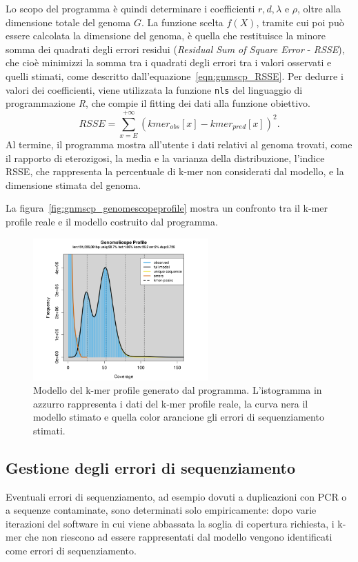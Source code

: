 \documentclass[crop=false, class=book]{standalone}
\begin{document}
	Lo scopo del programma è quindi determinare i coefficienti $r, d, \lambda$ e $\rho$, oltre alla dimensione totale del genoma $G$. La funzione scelta $f(X)$, tramite cui poi può essere calcolata la dimensione del genoma, è quella che restituisce la minore somma dei quadrati degli errori residui (\textit{Residual Sum of Square Error} - \textit{RSSE}), che cioè minimizzi la somma tra i quadrati degli errori tra i valori osservati e quelli stimati, come descritto dall'equazione~\vref{eqn:gnmscp_RSSE}. Per dedurre i valori dei coefficienti, viene utilizzata la funzione \verb|nls| del linguaggio di programmazione \textit{R}, che compie il \gls{fitting} dei dati alla funzione obiettivo.
	\begin{equation}
		RSSE = \sum_{x=E}^{+\infty} \left(kmer_{obs}[x] - kmer_{pred}[x]\right)^2.
	\label{eqn:gnmscp_RSSE}
	\end{equation}
	Al termine, il programma mostra all'utente i dati relativi al genoma trovati, come il rapporto di eterozigosi, la media e la varianza della distribuzione, l'indice RSSE, che rappresenta la percentuale di k-mer non considerati dal modello, e la dimensione stimata del genoma.
	
	La figura~\vref{fig:gnmscp_genomescopeprofile} mostra un confronto tra il k-mer profile reale e il modello costruito dal programma.
	
	\begin{figure}
		\centering
		\includegraphics[width=0.6\textwidth]{capitoli/metodi analizzati/genomescope/gnmscp_genomescopeprofile.png}
		\caption{Modello del k-mer profile generato dal programma. L'istogramma in azzurro rappresenta i dati del k-mer profile reale, la curva nera il modello stimato e quella color arancione gli errori di sequenziamento stimati.}
		\label{fig:gnmscp_genomescopeprofile}
	\end{figure}

	\subsection{Gestione degli errori di sequenziamento}
	Eventuali errori di sequenziamento, ad esempio dovuti a duplicazioni con PCR o a sequenze contaminate, sono determinati solo empiricamente: dopo varie iterazioni del software in cui viene abbassata la soglia di copertura richiesta, i k-mer che non riescono ad essere rappresentati dal modello vengono identificati come errori di sequenziamento. 
	
\end{document}
